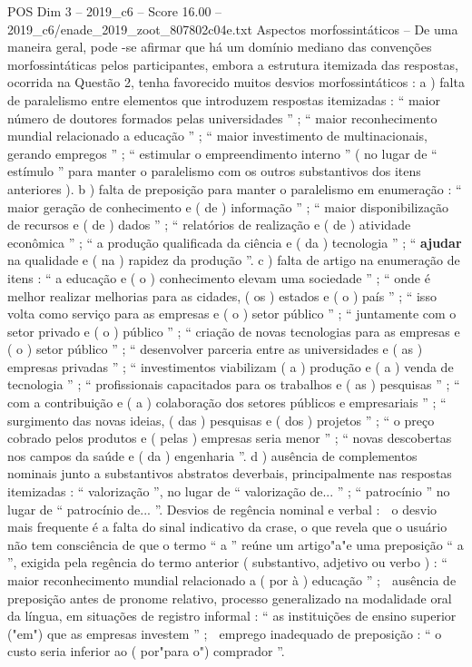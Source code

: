 \begin{textsample}{POS Dim 3 – 2019\_c6 – Score 16.00 – 2019\_c6/enade\_2019\_zoot\_807802c04e.txt}
Aspectos morfossintáticos – De uma maneira geral, pode -se afirmar que há um domínio mediano das convenções morfossintáticas pelos participantes, embora a estrutura itemizada das respostas, ocorrida na Questão 2, tenha favorecido muitos desvios morfossintáticos : a ) falta de paralelismo entre elementos que introduzem respostas itemizadas : “ maior número de doutores formados pelas universidades ” ; “ maior reconhecimento mundial relacionado a educação ” ; “ maior investimento de multinacionais, gerando empregos ” ; “ estimular o empreendimento interno ” ( no lugar de “ estímulo ” para manter o paralelismo com os outros substantivos dos itens anteriores ). b ) falta de preposição para manter o paralelismo em enumeração : “ maior geração de conhecimento e ( de ) informação ” ; “ maior disponibilização de recursos e ( de ) dados ” ; “ relatórios de realização e ( de ) atividade econômica ” ; “ a produção qualificada da ciência e ( da ) tecnologia ” ; “ \textbf{ajudar} na qualidade e ( na ) rapidez da produção ”. c ) falta de artigo na enumeração de itens : “ a educação e ( o ) conhecimento elevam uma sociedade ” ; “ onde é melhor realizar melhorias para as cidades, ( os ) estados e ( o ) país ” ; “ isso volta como serviço para as empresas e ( o ) setor público ” ; “ juntamente com o setor privado e ( o ) público ” ; “ criação de novas tecnologias para as empresas e ( o ) setor público ” ; “ desenvolver parceria entre as universidades e ( as ) empresas privadas ” ; “ investimentos viabilizam ( a ) produção e ( a ) venda de tecnologia ” ; “ profissionais capacitados para os trabalhos e ( as ) pesquisas ” ; “ com a contribuição e ( a ) colaboração dos setores públicos e empresariais ” ; “ surgimento das novas ideias, ( das ) pesquisas e ( dos ) projetos ” ; “ o preço cobrado pelos produtos e ( pelas ) empresas seria menor ” ; “ novas descobertas nos campos da saúde e ( da ) engenharia ”. d ) ausência de complementos nominais junto a substantivos abstratos deverbais, principalmente nas respostas itemizadas : “ valorização ”, no lugar de “ valorização de... ” ; “ patrocínio ” no lugar de “ patrocínio de... ”.
Desvios de regência nominal e verbal :  o desvio mais frequente é a falta do sinal indicativo da crase, o que revela que o usuário não tem consciência de que o termo “ a ” reúne um artigo"a"e uma preposição “ a ”, exigida pela regência do termo anterior ( substantivo, adjetivo ou verbo ) : “ maior reconhecimento mundial relacionado a ( por à ) educação ” ;  ausência de preposição antes de pronome relativo, processo generalizado na modalidade oral da língua, em situações de registro informal : “ as instituições de ensino superior ("em") que as empresas investem ” ;  emprego inadequado de preposição : “ o custo seria inferior ao ( por"para o") comprador ”.

\end{textsample}
